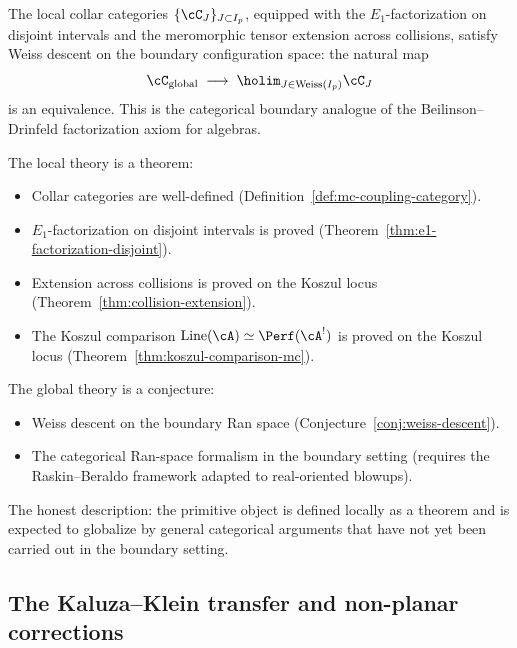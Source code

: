 \begin{conjecture}
\label{conj:weiss-descent}
The local collar categories $\{\cC_J\}_{J \subset I_p}$,
equipped with the $E_1$-factorization on disjoint intervals and the
meromorphic tensor extension across collisions, satisfy Weiss
descent on the boundary configuration space: the natural map
\[
 \cC_{\mathrm{global}}
 \;\longrightarrow\;
 \holim_{J \in \mathrm{Weiss}(I_p)} \cC_J
\]
is an equivalence. This is the categorical boundary analogue of
the Beilinson--Drinfeld factorization axiom for algebras.
\end{conjecture}

\begin{remark}
\label{rem:local-vs-global-honest}
The local theory is a theorem:
\begin{itemize}[nosep]
\item Collar categories are well-defined
 (Definition~\ref{def:mc-coupling-category}).
\item $E_1$-factorization on disjoint intervals is proved
 (Theorem~\ref{thm:e1-factorization-disjoint}).
\item Extension across collisions is proved on the Koszul locus
 (Theorem~\ref{thm:collision-extension}).
\item The Koszul comparison $\operatorname{Line}(\cA)
 \simeq \Perf(\cA^!)$ is proved on the Koszul locus
 (Theorem~\ref{thm:koszul-comparison-mc}).
\end{itemize}
The global theory is a conjecture:
\begin{itemize}[nosep]
\item Weiss descent on the boundary Ran space
 (Conjecture~\ref{conj:weiss-descent}).
\item The categorical Ran-space formalism in the boundary setting
 (requires the Raskin--Beraldo framework adapted to
 real-oriented blowups).
\end{itemize}
The honest description: the primitive object is defined locally
as a theorem and is expected to globalize by general categorical
arguments that have not yet been carried out in the boundary
setting.
\end{remark}

\subsection{The Kaluza--Klein transfer and non-planar corrections}
\label{subsec:kk-transfer-nonplanar}

